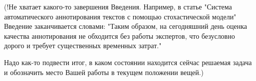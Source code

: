  (!Не хватает какого-то завершения Введения. Например, в статье "Система автоматического аннотирования текстов с
 помощью стохастической модели" Введение заканчивается словами:
 "Таким образом, на сегодняшний день оценка качества аннотирования не обходится без
 работы экспертов, что безусловно дорого и требует существенных временных затрат."
 
 Надо как-то подвести итог, в каком состоянии находится сейчас решаемая задача и обозначить место Вашей работы в текущем положении вещей.)

~\cite{martin_muss_2021}
\cite{voznesenskaya_automatic_2018}
~\cite{kazan_federal_university_kazan_russia_rusimplesenteval-2021_2021}
~\cite{noauthor_bart_nodate}
~\cite{noauthor_191013461_nodate}
~\cite{saint_petersburg_russia_rusimscore_2021}






